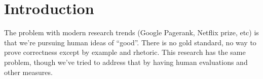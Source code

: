 \section{Introduction}

The problem with modern research trends (Google Pagerank, Netflix
prize, etc) is that we're pursuing human ideas of ``good''.
There is no gold standard, no way to prove correctness except
by example and rhetoric.
This research has the same problem, though we've tried to address
that by having human evaluations and other measures.

